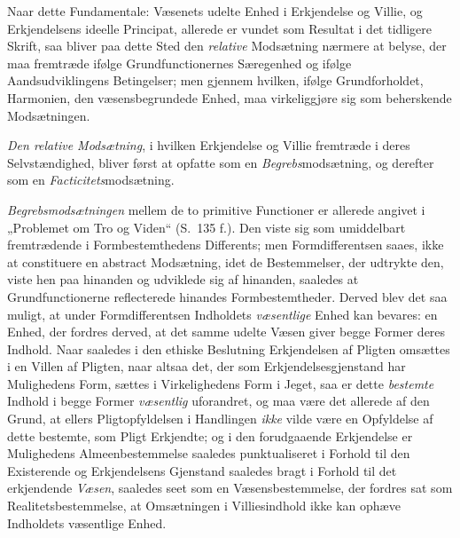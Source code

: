 Naar dette Fundamentale: Væsenets udelte Enhed i Erkjendelse og Villie, og
Erkjendelsens ideelle Principat, allerede er vundet som Resultat i det
tidligere Skrift, saa bliver paa dette Sted den \emph{relative} Modsætning
nærmere at belyse, der maa fremtræde ifølge Grundfunctionernes Særegenhed og
ifølge Aandsudviklingens Betingelser; men gjennem hvilken, ifølge
Grundforholdet, Harmonien, den væsensbegrundede Enhed, maa virkeliggjøre sig
som beherskende Modsætningen.

\emph{Den relative Modsætning}, i hvilken Erkjendelse og Villie fremtræde i
deres Selvstændighed, bliver først at opfatte som en \emph{Begrebs}modsætning,
og derefter som en \emph{Facticitets}modsætning.

\emph{Begrebsmodsætningen} mellem de to primitive Functioner er allerede
angivet i „Problemet om Tro og Viden“ (S.\ 135 f.). Den viste sig som
umiddelbart fremtrædende i Formbestemthedens Differents; men Formdifferentsen
saaes, ikke at constituere en abstract Modsætning, idet de Bestemmelser, der
udtrykte den, viste hen paa hinanden og udviklede sig af hinanden, saaledes at
Grundfunctionerne reflecterede hinandes Formbestemtheder.
Derved blev det saa muligt, at under Formdifferentsen Indholdets
\emph{væsentlige} Enhed kan bevares: en Enhed, der fordres derved, at det
samme udelte Væsen giver begge Former deres Indhold. Naar saaledes i den
ethiske Beslutning Erkjendelsen af Pligten omsættes i en Villen af Pligten,
naar altsaa det, der som Erkjendelsesgjenstand har Mulighedens Form, sættes i
Virkelighedens Form i Jeget, saa er dette \emph{bestemte} Indhold i begge
Former \emph{væsentlig} uforandret, og maa være det allerede af den Grund, at
ellers Pligtopfyldelsen i Handlingen \emph{ikke} vilde være en Opfyldelse af
dette bestemte, som Pligt Erkjendte; og i den forudgaaende
 Erkjendelse er Mulighedens Almeenbestemmelse saaledes punktualiseret i Forhold
til den Existerende og Erkjendelsens Gjenstand saaledes bragt i Forhold til
det erkjendende \emph{Væsen}, saaledes seet som en Væsensbestemmelse, der
fordres sat som Realitetsbestemmelse, at Omsætningen i Villiesindhold ikke kan
ophæve Indholdets væsentlige Enhed.

